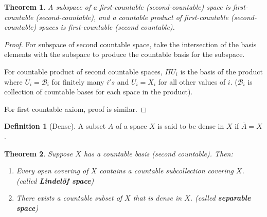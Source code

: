 \documentclass[12pt,reqno]{amsart}
\theoremstyle{plain}
\newtheorem{thm}{Theorem}
\theoremstyle{definition}
\newtheorem{defn}{Definition}
\newcommand{\cal}[1]{\mathcal{#1}}
\begin{document}
\begin{thm}
    A subspace of a first-countable (second-countable) space is first-countable (second-countable), and a countable product of first-countable (second-countable) spaces is first-countable (second countable).
\end{thm}
\begin{proof}
    For subspace of second countable space, take the intersection of the basis elements with the subspace to produce the countable basis for the subspace. 

    For countable product of second countable spaces, $\Pi U_i$ is the basis of the product where $U_i = \cal B_i$ for finitely many $i's$ and $U_i = X_i$ for all other values of $i$. ($\cal B_i$ is collection of countable bases for each space in the product).

    For first countable axiom, proof is similar.
\end{proof}

\begin{defn}[Dense]
    A subset $A$ of a space $X$ is said to be dense in $X$ if $\overline{A} = X$.
\end{defn}
\begin{thm}
    Suppose $X$ has a countable basis (second countable). Then:
    \begin{enumerate}
        \item Every open covering of $X$ contains a countable subcollection covering $X$. (called {\bf Lindel\"{o}f space})
        \item There exists a countable subset of $X$ that is dense in $X$. (called {\bf separable space})
    \end{enumerate}
\end{thm}
\end{document}
